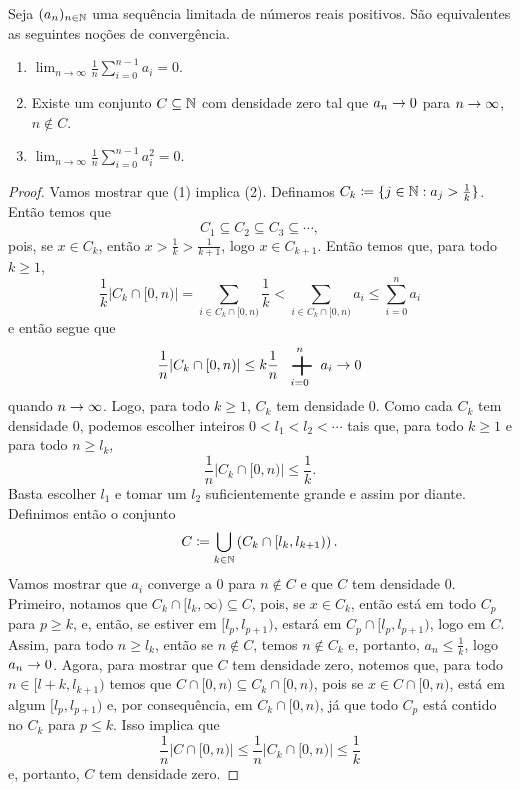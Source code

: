 \begin{lemma}
	Seja $(a_n)_{n \in \mathbb{N}}$ uma sequência limitada de números reais positivos. São equivalentes as seguintes noções de convergência.
	\begin{enumerate}
	\item $\lim_{n \to \infty} \frac{1}{n} \displaystyle\sum_{i=0}^{n-1} a_i =0$.
	\item Existe um conjunto $C \subseteq \mathbb{N}$ com densidade zero tal que $a_n \rightarrow 0$ para $n \rightarrow \infty$, $n \notin C$.
	\item $\lim_{n \to \infty} \frac{1}{n} \displaystyle\sum_{i=0}^{n-1} a_i^2 =0$.
	\end{enumerate}
\end{lemma}
\begin{proof}
Vamos mostrar que (1) implica (2). Definamos $C_k \coloneqq \{j \in \mathbb{N}:a_j>\frac{1}{k}\}$. Então temos que
	\begin{equation}
	C_1 \subseteq C_2 \subseteq C_3 \subseteq \cdots,
	\end{equation}
pois, se $x \in C_k$, então $x >\frac{1}{k}>\frac{1}{k+1}$, logo $x \in C_{k+1}$. Então temos que, para todo $k \geq 1$,
	\begin{equation*}
	\frac{1}{k} |C_k \cap [0,n)| = \sum_{i \in C_k \cap [0,n)} \frac{1}{k} < \sum_{i \in C_k \cap [0,n)} a_i \leq \sum_{i=0}^n a_i
	\end{equation*}
e então segue que
	\begin{equation*}
	\frac{1}{n}  |C_k \cap [0,n)| \leq k\frac{1}{n}\sum_{i=0}^n a_i \conv 0
	\end{equation*}
quando $n \rightarrow \infty$. Logo, para todo $k \geq 1$, $C_k$ tem densidade $0$. Como cada $C_k$ tem densidade $0$, podemos escolher inteiros $0<l_1<l_2<\cdots$ tais que, para todo $k \geq 1$ e para todo $n \geq l_k$,
	\begin{equation}
	\frac{1}{n}  |C_k \cap [0,n)| \leq \frac{1}{k}.
	\end{equation}
Basta escolher $l_1$ e tomar um $l_2$ suficientemente grande e assim por diante. Definimos então o conjunto
	\begin{equation}
	C \coloneqq \bigcup_{k \in \mathbb{N}} \left(C_k \cap [l_k,l_{k+1})\right).
	\end{equation}
Vamos mostrar que $a_i$ converge a $0$ para $n \notin C$ e que $C$ tem densidade $0$. Primeiro, notamos que $C_k \cap [l_k,\infty) \subseteq C$, pois, se $x \in C_k$, então está em todo $C_p$ para $p \geq k$, e, então, se estiver em $[l_p,l_{p+1})$, estará em $C_p \cap [l_p,l_{p+1})$, logo em $C$. Assim, para todo $n \geq l_k$, então se $n \notin C$, temos $n \notin C_k$ e, portanto, $a_n \leq \frac{1}{k}$, logo $a_n \rightarrow 0$. Agora, para mostrar que $C$ tem densidade zero, notemos que, para todo $n \in [l+k,l_{k+1})$ temos que $C \cap [0,n) \subseteq C_k \cap [0,n)$, pois se $x \in C \cap [0,n)$, está em algum $[l_p,l_{p+1})$ e, por consequência, em $C_k \cap [0,n)$, já que todo $C_p$ está contido no $C_k$ para $p \leq k$. Isso implica que
	\begin{equation}
	\frac{1}{n} |C \cap [0,n)| \leq \frac{1}{n}  |C_k \cap [0,n)| \leq \frac{1}{k}
	\end{equation}
e, portanto, $C$ tem densidade zero.


\end{proof}

